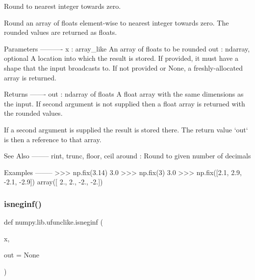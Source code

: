 \begin{DoxyVerb}Round to nearest integer towards zero.

Round an array of floats element-wise to nearest integer towards zero.
The rounded values are returned as floats.

Parameters
----------
x : array_like
    An array of floats to be rounded
out : ndarray, optional
    A location into which the result is stored. If provided, it must have
    a shape that the input broadcasts to. If not provided or None, a
    freshly-allocated array is returned.

Returns
-------
out : ndarray of floats
    A float array with the same dimensions as the input.
    If second argument is not supplied then a float array is returned
    with the rounded values.

    If a second argument is supplied the result is stored there.
    The return value `out` is then a reference to that array.

See Also
--------
rint, trunc, floor, ceil
around : Round to given number of decimals

Examples
--------
>>> np.fix(3.14)
3.0
>>> np.fix(3)
3.0
>>> np.fix([2.1, 2.9, -2.1, -2.9])
array([ 2.,  2., -2., -2.])\end{DoxyVerb}
 \mbox{\label{namespacenumpy_1_1lib_1_1ufunclike_aefdea205b9dfdbf965988f1175d67191}} 
\subsubsection{\texorpdfstring{isneginf()}{isneginf()}}
{\footnotesize\ttfamily def numpy.\+lib.\+ufunclike.\+isneginf (\begin{DoxyParamCaption}\item[{}]{x,  }\item[{}]{out = {\ttfamily None} }\end{DoxyParamCaption})}

